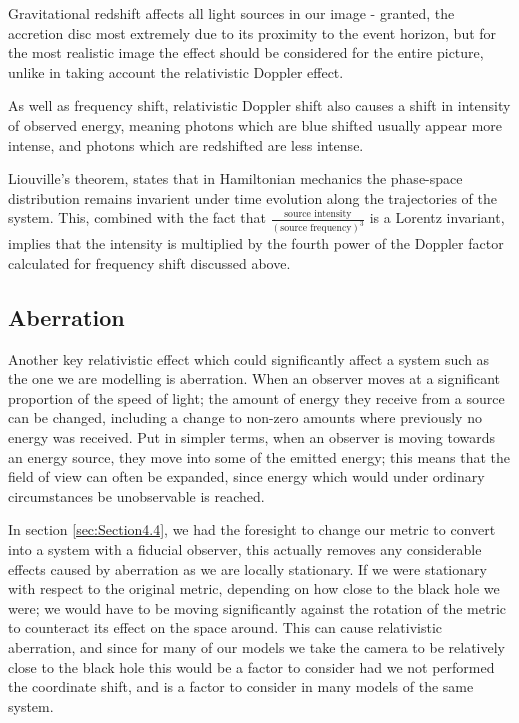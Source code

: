 \documentclass[oneside,openright,frontopenright, singlespacing]{dmathesis}
\begin{document}
\vspace{1em}
	Gravitational redshift affects all light sources in our image - granted, the accretion disc most extremely due to its proximity to the event horizon, but for the most realistic image the effect should be considered for the entire picture, unlike in taking account the relativistic Doppler effect.

\vspace{1em}
	As well as frequency shift, relativistic Doppler shift also causes a shift in intensity of observed energy, meaning photons which are blue shifted usually appear more intense, and photons which are redshifted are less intense.

\vspace{1em}
	Liouville's theorem\cite{Liouville1838}, states that in Hamiltonian mechanics the phase-space distribution remains invarient under time evolution along the trajectories of the system. This, combined with the fact that $\frac{\mbox{source intensity}}{(\mbox{source frequency})^3}$ is a Lorentz invariant\cite{johnson1982intensity}, implies that the intensity is multiplied by the fourth power of the Doppler factor calculated for frequency shift discussed above.

\subsection{Aberration}\label{subsec:Subsection5.2.3}

	Another key relativistic effect which could significantly affect a system such as the one we are modelling is aberration. When an observer moves at a significant proportion of the speed of light; the amount of energy they receive from a source can be changed, including a change to non-zero amounts where previously no energy was received. Put in simpler terms, when an observer is moving towards an energy source, they move into some of the emitted energy; this means that the field of view can often be expanded, since energy which would under ordinary circumstances be unobservable is reached.

\vspace{1em}
	In section \ref{sec:Section4.4}, we had the foresight to change our metric to convert into a system with a fiducial observer, this actually removes any considerable effects caused by aberration as we are locally stationary. If we were stationary with respect to the original metric, depending on how close to the black hole we were; we would have to be moving significantly against the rotation of the metric to counteract its effect on the space around. This can cause relativistic aberration, and since for many of our models we take the camera to be relatively close to the black hole this would be a factor to consider had we not performed the coordinate shift, and is a factor to consider in many models of the same system.
\end{document}
